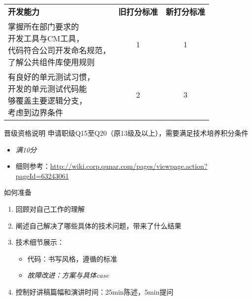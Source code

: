 \documentclass{beamer}
\begin{document}
\begin{CJK}{UTF8}{gbsn}
\begin{frame}
  \begin{tabular}{l | c | c}
    \hline
    \textbf{开发能力} & \textbf{旧打分标准} & \textbf{新打分标准} \\
    \hline
        { 掌握所在部门要求的 \\
          开发工具与CM工具，\\
          代码符合公司开发命名规范，\\
          了解公共组件库使用规则 } & {1} & {1} \\
    \hline
            { 有良好的单元测试习惯，\\
              开发的单元测试代码能\\
              够覆盖主要逻辑分支，\\
              考虑到边界条件 } & {2} & {3} \\
    \hline
  \end{tabular}

\end{frame}

\begin{frame}{晋级资格说明}
  申请职级Q15至Q20（原13级及以上），需要满足技术培养积分条件
  \begin{itemize}
  \item {
    \emph{满10分}
  }
  \item {细则参考：\url{http://wiki.corp.qunar.com/pages/viewpage.action?pageId=63243061}}
  \end{itemize}
  
\end{frame}


\begin{frame}{如何准备}
  \begin{enumerate}
  \item {
    回顾对自己工作的理解
  }
  \item {
    阐述自己解决了哪些具体的技术问题，带来了什么结果
  }
  \item {
    技术细节展示：
    \begin{itemize}
    \item { 代码：书写风格，遵循的标准 }
    \item \emph{故障改进：方案与具体case}
    \end{itemize}
  }
  \item {
    控制好讲稿篇幅和演讲时间：25min陈述，5min提问
  }
  \end{enumerate}
\end{frame}


\end{CJK}
\end{document}
